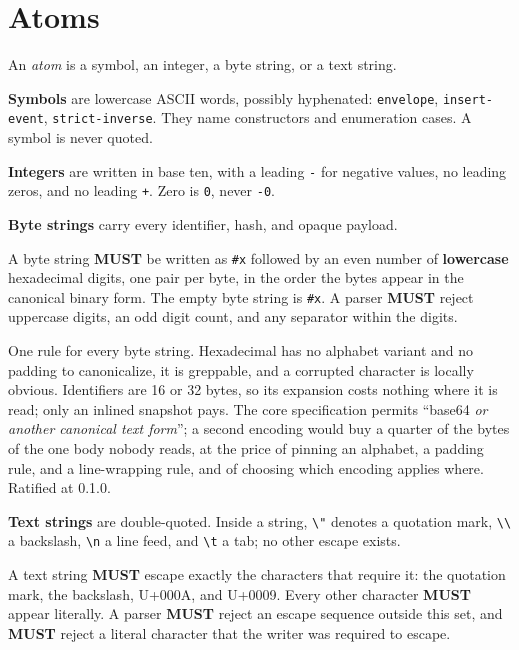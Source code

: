 \documentclass[11pt,letterpaper]{report}
\newcounter{requirement}[chapter]
\newcommand{\MUST}{\textbf{MUST}}
\begin{document}
\section{Atoms}

An \emph{atom} is a symbol, an integer, a byte string, or a text string.

\textbf{Symbols} are lowercase ASCII words, possibly hyphenated:
\texttt{envelope}, \texttt{insert-event}, \texttt{strict-inverse}. They name
constructors and enumeration cases. A symbol is never quoted.

\textbf{Integers} are written in base ten, with a leading \texttt{-} for negative
values, no leading zeros, and no leading \texttt{+}. Zero is \texttt{0}, never
\texttt{-0}.

\textbf{Byte strings} carry every identifier, hash, and opaque payload.

\begin{requirement}
  \label{req:textproj:hex}
  A byte string \MUST{} be written as \texttt{\#x} followed by an even number of
  \textbf{lowercase} hexadecimal digits, one pair per byte, in the order the
  bytes appear in the canonical binary form. The empty byte string is
  \texttt{\#x}. A parser \MUST{} reject uppercase digits, an odd digit count, and
  any separator within the digits.
\end{requirement}

\begin{rationale}
  One rule for every byte string. Hexadecimal has no alphabet variant and no
  padding to canonicalize, it is greppable, and a corrupted character is locally
  obvious. Identifiers are 16 or 32 bytes, so its expansion costs nothing where
  it is read; only an inlined snapshot pays. The core specification permits
  ``base64 \emph{or another canonical text form}''; a second encoding would buy
  a quarter of the bytes of the one body nobody reads, at the price of pinning an
  alphabet, a padding rule, and a line-wrapping rule, and of choosing which
  encoding applies where. Ratified at 0.1.0.
\end{rationale}

\textbf{Text strings} are double-quoted. Inside a string, \texttt{\textbackslash{}"}
denotes a quotation mark, \texttt{\textbackslash{}\textbackslash{}} a backslash,
\texttt{\textbackslash{}n} a line feed, and \texttt{\textbackslash{}t} a tab; no
other escape exists.

\begin{requirement}
  \label{req:textproj:string-escapes}
  A text string \MUST{} escape exactly the characters that require it: the
  quotation mark, the backslash, U+000A, and U+0009. Every other character
  \MUST{} appear literally. A parser \MUST{} reject an escape sequence outside
  this set, and \MUST{} reject a literal character that the writer was required
  to escape.
\end{requirement}
\end{document}
